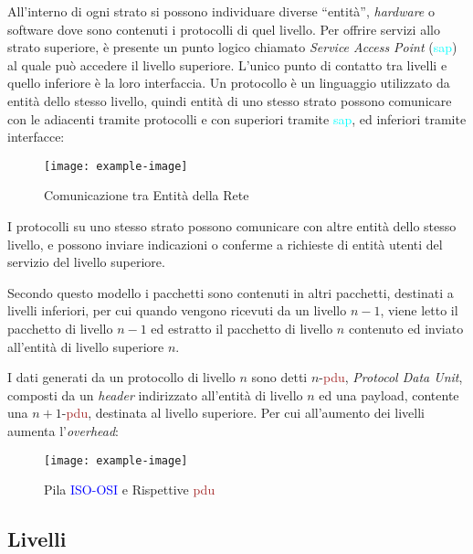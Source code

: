 \documentclass{article}
\numberwithin{equation}{subsection}
\begin{document}
All'interno di ogni strato si possono individuare diverse ``entità'', \textit{hardware} o software dove sono contenuti i protocolli di quel livello. Per offrire servizi allo 
strato superiore, è presente un punto logico chiamato \textit{Service Access Point} ({\textcolor{cyan}{sap}}) al quale può accedere il livello superiore. 
L'unico punto di contatto tra livelli e quello inferiore è la loro interfaccia. Un protocollo è un linguaggio utilizzato da entità dello stesso livello, quindi entità 
di uno stesso strato possono comunicare con le adiacenti tramite protocolli e con superiori tramite {\textcolor{cyan}{sap}}, ed inferiori tramite interfacce:
\begin{figure}[H]%
    \centering%
    \texttt{[image: example-image]}%
    \caption{Comunicazione tra Entità della Rete}%
\end{figure}
I protocolli su uno stesso strato possono comunicare con altre entità dello stesso livello, e possono inviare indicazioni o conferme a richieste di entità utenti del 
servizio del livello superiore. 

Secondo questo modello i pacchetti sono contenuti in altri pacchetti, destinati a livelli inferiori, per cui quando vengono ricevuti da un livello $n-1$, viene letto 
il pacchetto di livello $n-1$ ed estratto il pacchetto di livello $n$ contenuto ed inviato all'entità di livello superiore $n$. 

I dati generati da un protocollo di livello $n$ sono detti $n$-\textcolor{Brown}{pdu}, \textit{Protocol Data Unit}, composti da un \textit{header} indirizzato all'entità di livello $n$ ed una payload, 
contente una $n+1$-\textcolor{Brown}{pdu}, destinata al livello superiore. Per cui all'aumento dei livelli aumenta l'\textit{overhead}:
\begin{figure}[H]%
    \centering%
    \texttt{[image: example-image]}%
    \caption{Pila \textcolor{blue}{ISO-OSI} e Rispettive \textcolor{Brown}{pdu}}%
\end{figure}

\subsection{Livelli}
\end{document}
